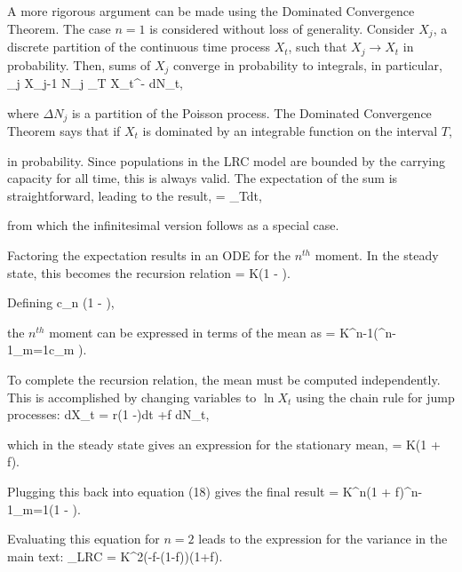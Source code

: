 A more rigorous argument can be made using the Dominated Convergence Theorem.  The case $n=1$ is considered without loss of generality.  Consider $X_j$, a discrete partition of the continuous time process $X_t$, such that $X_j \to X_t$ in probability.  Then, sums of $X_j$ converge in probability to integrals, in particular,
\be
\sum_j X_{j-1} \Delta N_j \to \int_T X_{t^-} dN_t,
\ee

\noindent where $\Delta N_j$ is a partition of the Poisson process.  The Dominated Convergence Theorem says that if $X_t$ is dominated by an integrable function on the interval $T$,
\be
\expec{} \to \expec{}
\ee

\noindent in probability.  Since populations in the LRC model are bounded by the carrying capacity for all time, this is always valid.  The expectation of the sum is straightforward, leading to the result,
\be
\expec{} = \int_T\expec[X_{t^-}]\lambda dt,
\ee

\noindent from which the infinitesimal version follows as a special case.

Factoring the expectation results in an ODE for the $n^{th}$ moment.  In the steady state, this becomes the recursion relation
\be
\expec[X^{n+1}] = K\left(1 - \right)\expec[X^{n}].
\ee

\noindent Defining 
\be
c_n \equiv \left(1 - \right),
\ee

\noindent the $n^{th}$ moment can be expressed in terms of the mean as
\be
\expec[X^n] = K^{n-1}\left(\prod^{n-1}_{m=1}c_m \right)\expec[X].
\ee

To complete the recursion relation, the mean must be computed independently.  This is accomplished by changing variables to $\ln X_t$ using the chain rule for jump processes:
\be
d\ln X_t = r\left(1 -\right)dt +\ln f dN_t,
\ee

\noindent which in the steady state gives an expression for the stationary mean,
\be
\expec[X] = K\left(1 + \ln f\right).
\ee

\noindent Plugging this back into equation (18) gives the final result
\be
\expec[X^n] = K^{n}\left(1 + \ln f\right)\prod^{n-1}_{m=1}\left(1 - \right).
\ee

\noindent Evaluating this equation for $n=2$ leads to the expression for the variance in the main text:
\be
 \Var[X]_{LRC} = K^2\left(-\ln f-(1-f)\right)\left(1+\ln f\right).
\ee


